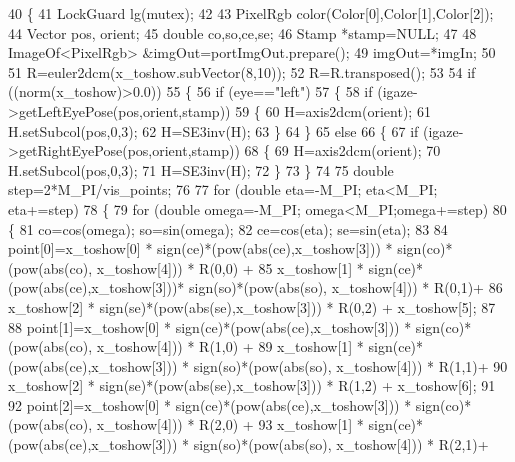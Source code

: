 \begin{DoxyCode}
40 \{
41     LockGuard lg(mutex);
42 
43     PixelRgb color(Color[0],Color[1],Color[2]);
44     Vector pos, orient;
45     \textcolor{keywordtype}{double} co,so,ce,se;
46     Stamp *stamp=NULL;
47 
48     ImageOf<PixelRgb> &imgOut=portImgOut.prepare();
49     imgOut=*imgIn;
50 
51     R=euler2dcm(x\_toshow.subVector(8,10));
52     R=R.transposed();
53 
54     \textcolor{keywordflow}{if} ((norm(x\_toshow)>0.0))
55     \{
56         \textcolor{keywordflow}{if} (eye==\textcolor{stringliteral}{"left"})
57         \{
58             \textcolor{keywordflow}{if} (igaze->getLeftEyePose(pos,orient,stamp))
59             \{
60                 H=axis2dcm(orient);
61                 H.setSubcol(pos,0,3);
62                 H=SE3inv(H);
63             \}
64         \}
65         \textcolor{keywordflow}{else}
66         \{
67             \textcolor{keywordflow}{if} (igaze->getRightEyePose(pos,orient,stamp))
68             \{
69                 H=axis2dcm(orient);
70                 H.setSubcol(pos,0,3);
71                 H=SE3inv(H);
72             \}
73         \}
74 
75         \textcolor{keywordtype}{double} step=2*M\_PI/vis_points;
76 
77         \textcolor{keywordflow}{for} (\textcolor{keywordtype}{double} eta=-M\_PI; eta<M\_PI; eta+=step)
78         \{
79              \textcolor{keywordflow}{for} (\textcolor{keywordtype}{double} omega=-M\_PI; omega<M\_PI;omega+=step)
80              \{
81                  co=cos(omega); so=sin(omega);
82                  ce=cos(eta); se=sin(eta);
83 
84                  point[0]=x\_toshow[0] * sign(ce)*(pow(abs(ce),x\_toshow[3])) * sign(co)*(pow(abs(co),
      x\_toshow[4])) * R(0,0) +
85                             x\_toshow[1] * sign(ce)*(pow(abs(ce),x\_toshow[3]))* sign(so)*(pow(abs(so),
      x\_toshow[4])) * R(0,1)+
86                                 x\_toshow[2] * sign(se)*(pow(abs(se),x\_toshow[3])) * R(0,2) + x\_toshow[5];
87 
88                  point[1]=x\_toshow[0] * sign(ce)*(pow(abs(ce),x\_toshow[3])) * sign(co)*(pow(abs(co),
      x\_toshow[4])) * R(1,0) +
89                             x\_toshow[1] * sign(ce)*(pow(abs(ce),x\_toshow[3])) * sign(so)*(pow(abs(so),
      x\_toshow[4])) * R(1,1)+
90                                 x\_toshow[2] * sign(se)*(pow(abs(se),x\_toshow[3])) * R(1,2) + x\_toshow[6];
91 
92                  point[2]=x\_toshow[0] * sign(ce)*(pow(abs(ce),x\_toshow[3])) * sign(co)*(pow(abs(co),
      x\_toshow[4])) * R(2,0) +
93                             x\_toshow[1] * sign(ce)*(pow(abs(ce),x\_toshow[3])) * sign(so)*(pow(abs(so),
      x\_toshow[4])) * R(2,1)+

\end{DoxyCode}
